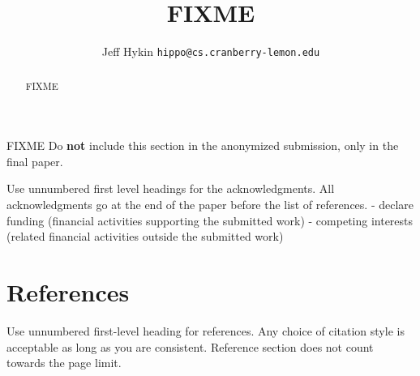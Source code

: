 \documentclass{article}
\title{FIXME}
\author{%
    Jeff Hykin
    \texttt{hippo@cs.cranberry-lemon.edu} \\
}
\begin{document}
    \maketitle
    \begin{abstract}
        FIXME
    \end{abstract}





    \begin{ack}
        FIXME
        Do {\bf not} include this section in the anonymized submission, only in the final paper.
        
        Use unnumbered first level headings for the acknowledgments.
        All acknowledgments go at the end of the paper before the list of references.
        - declare funding (financial activities supporting the submitted work)
        - competing interests (related financial activities outside the submitted work)
    \end{ack}


    \section*{References}
        Use unnumbered first-level heading for references.
        Any choice of citation style is acceptable as long as you are consistent.
        Reference section does not count towards the page limit.
    \medskip





\end{document}
